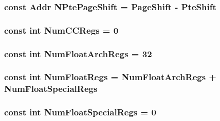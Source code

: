 \label{namespacePowerISA_ae295358052b4e754e08cd5cd763c212a}
\hypertarget{namespacePowerISA_a9f060ccda225dfb28dff712695adab46}{
\subsubsection[{NPtePageShift}]{\setlength{\rightskip}{0pt plus 5cm}const {\bf Addr} {\bf NPtePageShift} = {\bf PageShift} -\/ {\bf PteShift}}}
\label{namespacePowerISA_a9f060ccda225dfb28dff712695adab46}
\hypertarget{namespacePowerISA_a717317b863009b3e1b683c3bdddb9fd3}{
\subsubsection[{NumCCRegs}]{\setlength{\rightskip}{0pt plus 5cm}const int {\bf NumCCRegs} = 0}}
\label{namespacePowerISA_a717317b863009b3e1b683c3bdddb9fd3}
\hypertarget{namespacePowerISA_a9ec947def3616ab9415089776195fa09}{
\subsubsection[{NumFloatArchRegs}]{\setlength{\rightskip}{0pt plus 5cm}const int {\bf NumFloatArchRegs} = 32}}
\label{namespacePowerISA_a9ec947def3616ab9415089776195fa09}
\hypertarget{namespacePowerISA_a627b25288f2452be107872a138df8b85}{
\subsubsection[{NumFloatRegs}]{\setlength{\rightskip}{0pt plus 5cm}const int {\bf NumFloatRegs} = {\bf NumFloatArchRegs} + {\bf NumFloatSpecialRegs}}}
\label{namespacePowerISA_a627b25288f2452be107872a138df8b85}
\hypertarget{namespacePowerISA_a49908eb80616530afc519599ec46e42e}{
\subsubsection[{NumFloatSpecialRegs}]{\setlength{\rightskip}{0pt plus 5cm}const int {\bf NumFloatSpecialRegs} = 0}}

